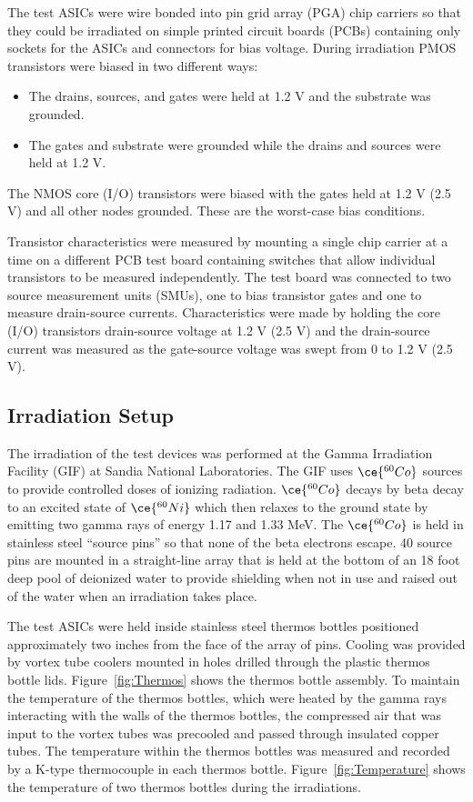 The test ASICs were wire bonded into pin grid array (PGA) chip carriers so that they could be irradiated on simple printed circuit boards (PCBs) containing only sockets for the ASICs and connectors for bias voltage. During irradiation PMOS transistors were biased in two different ways: 

\begin{itemize}
\item The drains, sources, and gates were held at 1.2 V and the substrate was grounded. 
\item The gates and substrate were grounded while the drains and sources were held at 1.2 V. 
\end{itemize}
The NMOS core (I/O) transistors were biased with the gates held at 1.2 V (2.5 V) and all other nodes grounded. These are the worst-case bias conditions.

Transistor characteristics were measured by mounting a single chip carrier at a time on a different PCB test board containing switches that allow individual transistors to be measured independently. The test board was connected to two source measurement units (SMUs), one to bias transistor gates and one to measure drain-source currents. Characteristics were made by holding the core (I/O) transistors drain-source voltage at 1.2 V (2.5 V) and the drain-source current was measured as the gate-source voltage was swept from 0 to 1.2 V (2.5 V). 

\subsection{Irradiation Setup}

The irradiation of the test devices was performed at the Gamma Irradiation Facility (GIF) at Sandia National Laboratories.  The GIF uses $\ce{^{60}Co}$ sources to provide controlled doses of ionizing radiation. $\ce{^{60}Co}$ decays by beta decay to an excited state of $\ce{^{60}Ni}$ which then relaxes to the ground state by emitting two gamma rays of energy 1.17 and 1.33 MeV. The $\ce{^{60}Co}$ is held in stainless steel ``source pins'' so that none of the beta electrons escape. 40 source pins are mounted in a straight-line array that is held at the bottom of an 18 foot deep pool of deionized water to provide shielding when not in use and raised out of the water when an irradiation takes place.

The test ASICs were held inside stainless steel thermos bottles positioned approximately two inches from the face of the array of pins. Cooling was provided by vortex tube coolers mounted in holes drilled through the plastic thermos bottle lids. Figure~\ref{fig:Thermos} shows the thermos bottle assembly. To maintain the temperature of the thermos bottles, which were heated by the gamma rays interacting with the walls of the thermos bottles, the compressed air that was input to the vortex tubes was precooled and passed through insulated copper tubes. The temperature within the thermos bottles was measured and recorded by a K-type thermocouple in each thermos bottle. Figure~\ref{fig:Temperature} shows the temperature of two thermos bottles during the irradiations.


